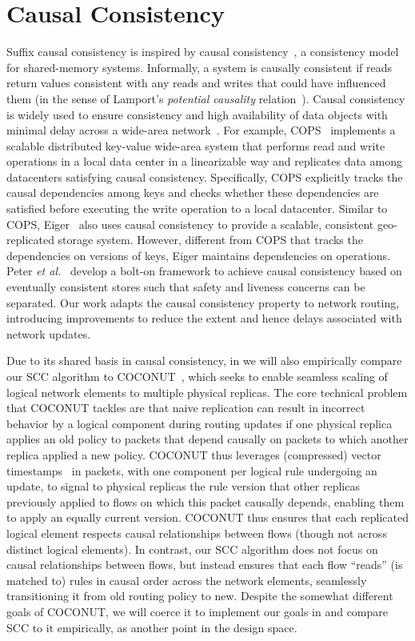 \section{Causal Consistency}
\label{sec:causal}
Suffix causal consistency is inspired by
causal consistency~\cite{causal}, a consistency model for
shared-memory systems.  Informally, a system is causally consistent if
reads return values consistent with any reads and writes that could
have influenced them (in the sense of Lamport's \textit{potential
  causality} relation~\cite{LamportClock}).  Causal consistency is
widely used to ensure consistency and high availability of data
objects with minimal delay across a wide-area network~\cite{cops,
  eiger, bolton}. For example, COPS~\cite{cops} implements a scalable distributed key-value wide-area system that performs read and write operations in a local data center in a linearizable way and replicates data among datacenters satisfying causal consistency. Specifically, COPS explicitly tracks the causal dependencies among keys and checks whether these dependencies are satisfied before executing the write operation to a local datacenter.
Similar to COPS, Eiger~\cite{eiger} also uses causal consistency to provide a scalable, consistent geo-replicated storage system. However, different from COPS that tracks the dependencies on versions of keys, Eiger maintains dependencies on operations. Peter \textit{et al.}~\cite{bolton} develop a bolt-on framework to achieve causal consistency based on eventually consistent stores such that safety and liveness concerns can be separated. 
Our work adapts the causal consistency property to network routing, introducing improvements to reduce the extent and hence
delays associated with network updates.

Due to its shared basis in causal consistency, in 
we will also empirically compare our SCC algorithm to COCONUT~\cite{COCONUT}, which seeks
to enable seamless scaling of logical network elements to multiple
physical replicas.  The core technical problem that COCONUT tackles are
that naive replication can result in incorrect behavior by a logical
component during routing updates if one physical replica applies an
old policy to packets that depend causally on packets to which another
replica applied a new policy.  COCONUT thus leverages (compressed)
vector timestamps~\cite{fidge88,mattern88} in packets, with one
component per logical rule undergoing an update, to signal to physical
replicas the rule version that other replicas previously applied to
flows on which this packet causally depends, enabling them to apply an
equally current version.  COCONUT thus ensures that each replicated
logical element respects causal relationships between flows (though
not across distinct logical elements).  In contrast, our SCC algorithm does not focus on
causal relationships between flows, but instead ensures that each flow
``reads'' (is matched to) rules in causal order across the network
elements, seamlessly transitioning it from old routing policy to new.
Despite the somewhat different goals of COCONUT, we will coerce it to
implement our goals in  and compare SCC to it
empirically, as another point in the design space.



